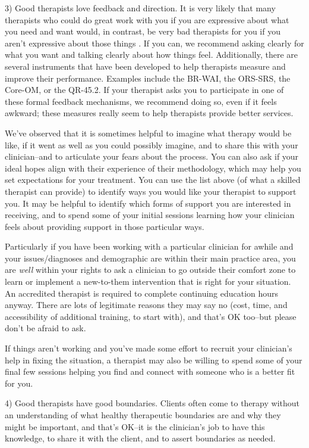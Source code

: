 \documentclass[12pt,letterpaper]{book}
\begin{document}
3) Good therapists love feedback and direction. It is very likely that many therapists who could do great work with you if you are expressive about what you need and want would, in contrast, be very bad therapists for you if you aren't expressive about those things \cite{macdonald2015correcting,delgadillo2022progress,lambert2001effects,oanes2015therapists}. If you can, we recommend asking clearly for what you want and talking clearly about how things feel. Additionally, there are several instruments that have been developed to help therapists measure and improve their performance. Examples include the BR-WAI, the ORS-SRS, the Core-OM, or the QR-45.2. If your therapist asks you to participate in one of these formal feedback mechanisms, we recommend doing so, even if it feels awkward; these measures really seem to help therapists provide better services.

We've observed that it is sometimes helpful to imagine what therapy would be like, if it went as well as you could possibly imagine, and to share this with your clinician--and to articulate your fears about the process.  You can also ask if your ideal hopes align with their experience of their methodology, which may help you set expectations for your treatment. You can use the list above (of what a skilled therapist can provide) to identify ways you would like your therapist to support you. It may be helpful to identify which forms of support you are interested in receiving, and to spend some of your initial sessions learning how your clinician feels about providing support in those particular ways.

Particularly if you have been working with a particular clinician for awhile and your issues/diagnoses and demographic are within their main practice area, you are \textit{well} within your rights to ask a clinician to go outside their comfort zone to learn or implement a new-to-them intervention that is right for your situation. An accredited therapist is required to complete continuing education hours anyway. There are lots of legitimate reasons they may say no (cost, time, and accessibility of additional training, to start with), and that's OK too--but please don't be afraid to ask.

If things aren't working and you've made some effort to recruit your clinician's help in fixing the situation, a therapist may also be willing to spend some of your final few sessions helping you find and connect with someone who is a better fit for you.

4) Good therapists have good boundaries. Clients often come to therapy without an understanding of what healthy therapeutic boundaries are and why they might be important, and that's OK--it is the clinician's job to have this knowledge, to share it with the client, and to assert boundaries as needed.
\end{document}
